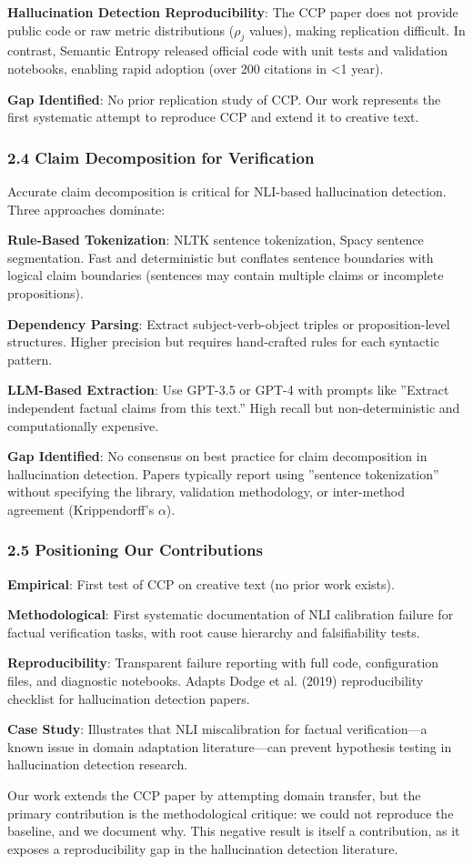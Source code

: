 \textbf{Hallucination Detection Reproducibility}: The CCP paper does not provide public code or raw metric distributions ($\rho_j$ values), making replication difficult. In contrast, Semantic Entropy released official code with unit tests and validation notebooks, enabling rapid adoption (over 200 citations in <1 year).

\textbf{Gap Identified}: No prior replication study of CCP. Our work represents the first systematic attempt to reproduce CCP and extend it to creative text.

\subsubsection{2.4 Claim Decomposition for Verification}

Accurate claim decomposition is critical for NLI-based hallucination detection. Three approaches dominate:

\textbf{Rule-Based Tokenization}: NLTK sentence tokenization, Spacy sentence segmentation. Fast and deterministic but conflates sentence boundaries with logical claim boundaries (sentences may contain multiple claims or incomplete propositions).

\textbf{Dependency Parsing}: Extract subject-verb-object triples or proposition-level structures. Higher precision but requires hand-crafted rules for each syntactic pattern.

\textbf{LLM-Based Extraction}: Use GPT-3.5 or GPT-4 with prompts like ''Extract independent factual claims from this text.'' High recall but non-deterministic and computationally expensive.

\textbf{Gap Identified}: No consensus on best practice for claim decomposition in hallucination detection. Papers typically report using ''sentence tokenization'' without specifying the library, validation methodology, or inter-method agreement (Krippendorff's $\alpha$).

\subsubsection{2.5 Positioning Our Contributions}

\textbf{Empirical}: First test of CCP on creative text (no prior work exists).

\textbf{Methodological}: First systematic documentation of NLI calibration failure for factual verification tasks, with root cause hierarchy and falsifiability tests.

\textbf{Reproducibility}: Transparent failure reporting with full code, configuration files, and diagnostic notebooks. Adapts Dodge et al. (2019) reproducibility checklist for hallucination detection papers.

\textbf{Case Study}: Illustrates that NLI miscalibration for factual verification---a known issue in domain adaptation literature---can prevent hypothesis testing in hallucination detection research.

Our work extends the CCP paper by attempting domain transfer, but the primary contribution is the methodological critique: we could not reproduce the baseline, and we document why. This negative result is itself a contribution, as it exposes a reproducibility gap in the hallucination detection literature.
